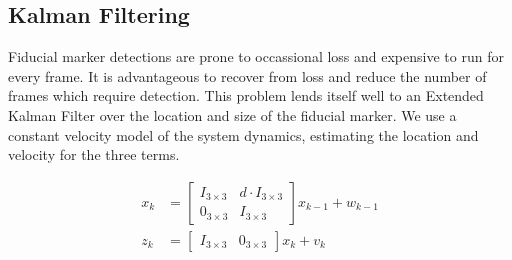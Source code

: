 \documentclass[letterpaper,10pt,conference]{IEEEtran}
\begin{document}
\subsection{Kalman Filtering}
Fiducial marker detections are prone to occassional loss and expensive to run for every frame.  It is advantageous to recover from loss and reduce the number of frames which require detection.  This problem lends itself well to an Extended Kalman Filter over the location and size of the fiducial marker.  We use a constant velocity model of the system dynamics, estimating the location and velocity for the three terms.

\begin{align}
x_k &= \left[ \begin{array}{cc}
I_{3\times 3} & d\cdot I_{3\times 3}\\
0_{3\times 3} & I_{3\times 3}
\end{array} \right] x_{k-1} + w_{k-1}\\
z_k &= \left[ \begin{array}{cc}
I_{3\times 3} & 0_{3\times 3}
\end{array} \right] x_k + v_k
\end{align}
\end{document}

